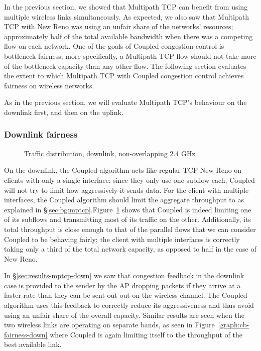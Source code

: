 In the previous section, we showed that Multipath TCP can benefit from using
multiple wireless links simultaneously. As expected, we also saw that Multipath
TCP with New Reno was using an unfair share of the networks' resources;
approximately half of the total available bandwidth when there was a competing
flow on each network. One of the goals of Coupled congestion control is
bottleneck fairness; more specifically, a Multipath TCP flow should not take
more of the bottleneck capacity than any other flow. The following section
evaluates the extent to which Multipath TCP with Coupled congestion control
achieves fairness on wireless networks.

As in the previous section, we will evaluate Multipath TCP's behaviour on the
downlink first, and then on the uplink.

\subsubsection{Downlink fairness}

\begin{figure}[h]
 \centering
 
 \caption{Traffic distribution, downlink, non-overlapping 2.4 GHz}\label{graph:down-fair}
\end{figure}

On the downlink, the Coupled algorithm acts like regular TCP New Reno on clients
with only a single interface; since they only use one subflow each, Coupled will
not try to limit how aggressively it sends data. For the client with multiple
interfaces, the Coupled algorithm should limit the aggregate throughput to as
explained in \S\ref{sec:bg:mptcp}.\@ Figure~\ref{graph:down-fair} shows that
Coupled is indeed limiting one of its subflows and transmitting most of its
traffic on the other. Additionally, its total throughput is close enough to that
of the parallel flows that we can consider Coupled to be behaving fairly; the
client with multiple interfaces is correctly taking only a third of the total
network capacity, as opposed to half in the case of New Reno.


In \S\ref{sec:results-mptcp-down} we saw that congestion feedback in the
downlink case is provided to the sender by the AP dropping packets if they
arrive at a faster rate than they can be sent out out on the wireless channel.
The Coupled algorithm uses this feedback to correctly reduce its aggressiveness
and thus avoid using an unfair share of the overall capacity. Similar results
are seen when the two wireless links are operating on separate bands, as seen in
Figure~\ref{graph:cb-fairness-down} where Coupled is again limiting itself to
the throughput of the best available link.

